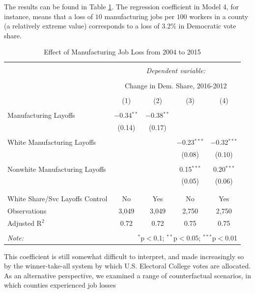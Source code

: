 \documentclass[]{AEA}
\begin{document}
The results can be found in Table \ref{regResult04}. The regression
coefficient in Model 4, for instance, means that a loss of \(10\)
manufacturing jobs per \(100\) workers in a county (a relatively extreme
value) corresponds to a loss of \(3.2 \%\) in Democratic vote share.

\begin{table}[!htbp] \centering 
  \caption{Effect of Manufacturing Job Loss from 2004 to 2015} 
  \label{regResult04} 
\begin{tabular}{@{\extracolsep{5pt}}lcccc} 
\\[-1.8ex]\hline 
\hline \\[-1.8ex] 
 & \multicolumn{4}{c}{\textit{Dependent variable:}} \\ 
\cline{2-5} 
\\[-1.8ex] & \multicolumn{4}{c}{Change in Dem. Share, 2016-2012} \\ 
\\[-1.8ex] & (1) & (2) & (3) & (4)\\ 
\hline \\[-1.8ex] 
 Manufacturing Layoffs & $-$0.34$^{**}$ & $-$0.38$^{**}$ &  &  \\ 
  & (0.14) & (0.17) &  &  \\ 
  & & & & \\ 
 White Manufacturing Layoffs &  &  & $-$0.23$^{***}$ & $-$0.32$^{***}$ \\ 
  &  &  & (0.08) & (0.10) \\ 
  & & & & \\ 
 Nonwhite Manufacturing Layoffs &  &  & 0.15$^{***}$ & 0.20$^{***}$ \\ 
  &  &  & (0.05) & (0.06) \\ 
  & & & & \\ 
\hline \\[-1.8ex] 
White Share/Svc Layoffs Control & No & Yes & No & Yes \\ 
Observations & 3,049 & 3,049 & 2,750 & 2,750 \\ 
Adjusted R$^{2}$ & 0.72 & 0.72 & 0.75 & 0.75 \\ 
\hline 
\hline \\[-1.8ex] 
\textit{Note:}  & \multicolumn{4}{r}{$^{*}$p$<$0.1; $^{**}$p$<$0.05; $^{***}$p$<$0.01} \\ 
\end{tabular} 
\end{table}

This coefficient is still somewhat difficult to interpret, and made
increasingly so by the winner-take-all system by which U.S. Electoral
College votes are allocated. As an alternative perspective, we examined
a range of counterfactual scenarios, in which counties experienced job
losses
\end{document}

